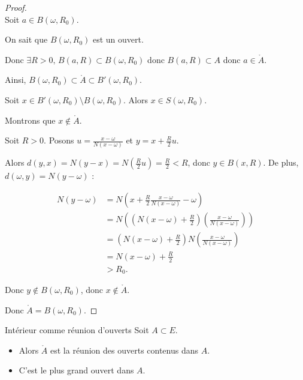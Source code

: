 \begin{proof}~\\
    Soit $a \in B(\omega, R_0)$. 

    On sait que $B(\omega, R_0)$ est un ouvert. 

    Donc $\exists R > 0, \, B(a, R) \subset B(\omega, R_0)$ 
    donc $B(a, R) \subset A$ donc $a \in \mathring{A}$.

    Ainsi, $B(\omega, R_0) \subset \mathring{A} \subset B'(\omega, R_0)$.

    Soit $x \in B'(\omega, R_0) \setminus B(\omega, R_0)$.
    Alors $x \in S(\omega, R_0)$. 

    Montrons que $x \not \in \mathring A$. 

    Soit $R > 0$. Posons $u = \frac{x - \omega}{N(x - \omega)}$ et $y = x + \frac R 2 u$.

    Alors $d(y, x) = N(y - x) = N\left( \frac R 2 u \right) = \frac R 2 < R$, donc $y \in B(x, R)$.
    De plus, $d(\omega, y) = N(y - \omega)$ :

    \begin{align*}
        N(y - \omega) & = N\left(x + \frac R 2 \frac{x - \omega}{N(x - \omega)} - \omega\right) \\
        & = N\left( \left( N(x - \omega) + \frac R 2 \right) \left( \frac{x - \omega}{N(x - \omega)}\right) \right) \\
        & = \left(N(x - \omega) + \frac R 2\right) N\left(\frac {x - \omega} {N(x - \omega)}\right) \\
        & = N(x - \omega) + \frac R 2 \\
        & > R_0.
    \end{align*}

    Donc $y \not \in B(\omega, R_0)$, donc $x \not \in \mathring A$.

    Donc $\mathring A = B(\omega, R_0)$.
\end{proof}

\begin{theoreme}{Intérieur comme réunion d'ouverts}{}
    Soit $A \subset E$.
    \begin{itemize}
        \item Alors $\mathring{A}$ est la réunion des ouverts contenus dans $A$.
        \item C'est le plus grand ouvert dans $A$.
    \end{itemize}
\end{theoreme}

